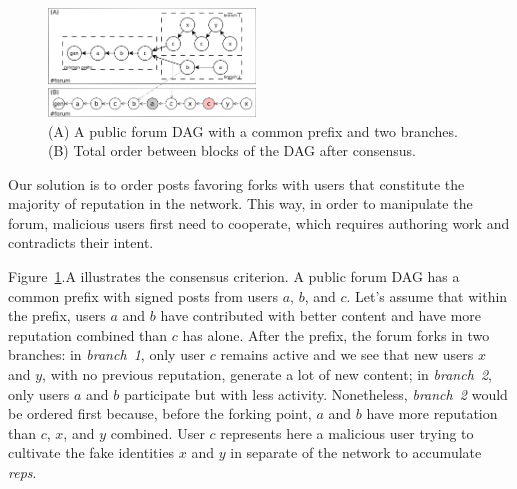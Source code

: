 \documentclass[10pt,journal,compsoc]{IEEEtran}
\newcommand{\reps}     {\emph{reps}\xspace}
\begin{document}
\begin{figure}
\centering
\includegraphics[width=0.49\textwidth]{reps2.png}
\caption{
    (A) A public forum DAG with a common prefix and two branches.
    (B) Total order between blocks of the DAG after consensus.
}
\label{fig.reps}
\end{figure}

Our solution is to order posts favoring forks with users that constitute the
majority of reputation in the network.
This way, in order to manipulate the forum, malicious users first need to
cooperate, which requires authoring work and contradicts their intent.

Figure~\ref{fig.reps}.A illustrates the consensus criterion.
A public forum DAG has a common prefix with signed posts from users $a$, $b$,
and $c$.
Let's assume that within the prefix, users $a$ and $b$ have contributed with
better content and have more reputation combined than $c$ has alone.
%
After the prefix, the forum forks in two branches:
in \emph{branch~1}, only user $c$ remains active and we see that new users $x$
and $y$, with no previous reputation, generate a lot of new content;
in \emph{branch~2}, only users $a$ and $b$ participate but with less activity.
Nonetheless, \emph{branch~2} would be ordered first because, before the forking
point, $a$ and $b$ have more reputation than $c$, $x$, and $y$ combined.
%
User $c$ represents here a malicious user trying to cultivate the fake
identities $x$ and $y$ in separate of the network to accumulate \reps.
\end{document}
